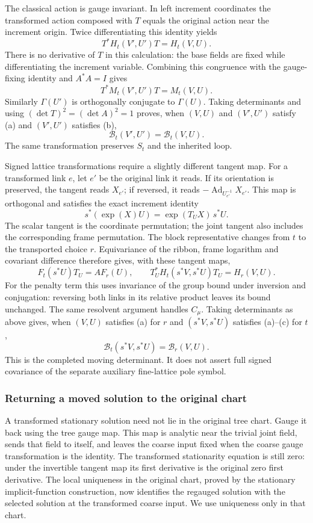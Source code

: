 The classical action is gauge invariant. In left increment coordinates
the transformed action composed with $T$ equals the original action
near the increment origin. Twice differentiating this identity yields
\[
 T^*H_t(V',U')T=H_t(V,U).
\]
There is no derivative of $T$ in this calculation: the base fields
are fixed while differentiating the increment variable. Combining
this congruence with the gauge-fixing identity and $A^*A=I$ gives
\[
 T^*M_t(V',U')T=M_t(V,U).
\]
Similarly $\Gamma(U')$ is orthogonally conjugate to $\Gamma(U)$.
Taking determinants and using $(\det T)^2=(\det A)^2=1$ proves, when
$(V,U)$ and $(V',U')$ satisfy (a) and $(V',U')$ satisfies (b),
\begin{equation}\label{eq:stationary-germ-gauge-det}
                   \mathcal B_t(V',U')=\mathcal B_t(V,U).
\end{equation}
The same transformation preserves $S_t$ and the inherited loop.

Signed lattice transformations require a slightly different tangent
map. For a transformed link $e$, let $e'$ be the original link it
reads. If its orientation is preserved, the tangent reads $X_{e'}$;
if reversed, it reads $-\operatorname{Ad}_{U_{e'}^{-1}}X_{e'}$.
This map is orthogonal and satisfies the exact increment identity
\[
 s^*(\exp(X)U)=\exp(T_UX)\,s^*U.
\]
The scalar tangent is the coordinate permutation; the joint tangent
also includes the corresponding frame permutation. The block
representative changes from $t$ to the transported choice $r$.
Equivariance of the ribbon, frame logarithm and covariant difference
therefore gives, with these tangent maps,
\[
 F_t(s^*U)T_U=AF_r(U),\qquad
 T_U^*H_t(s^*V,s^*U)T_U=H_r(V,U).
\]
For the penalty term this uses invariance of the group bound under
inversion and conjugation: reversing both links in its relative
product leaves its bound unchanged. The same resolvent argument
handles $C_\mu$. Taking determinants as above gives, when
$(V,U)$ satisfies (a) for $r$ and $(s^*V,s^*U)$ satisfies (a)--(c)
for $t$,
\begin{equation}\label{eq:stationary-germ-signed-det}
                    \mathcal B_t(s^*V,s^*U)=\mathcal B_r(V,U).
\end{equation}
This is the completed moving determinant. It does not assert full
signed covariance of the separate auxiliary fine-lattice pole symbol.

\subsubsection{Returning a moved solution to the original chart}
A transformed stationary solution need not lie in the original tree
chart. Gauge it back using the tree gauge map. This map is analytic
near the trivial joint field, sends that field to itself, and leaves
the coarse input fixed when the coarse gauge transformation is the
identity. The transformed stationarity equation is still zero:
under the invertible tangent map its first derivative is the original
zero first derivative. The local uniqueness in the original chart,
proved by the stationary implicit-function construction, now identifies
the regauged solution with the selected solution at the transformed
coarse input. We use uniqueness only in that chart.

